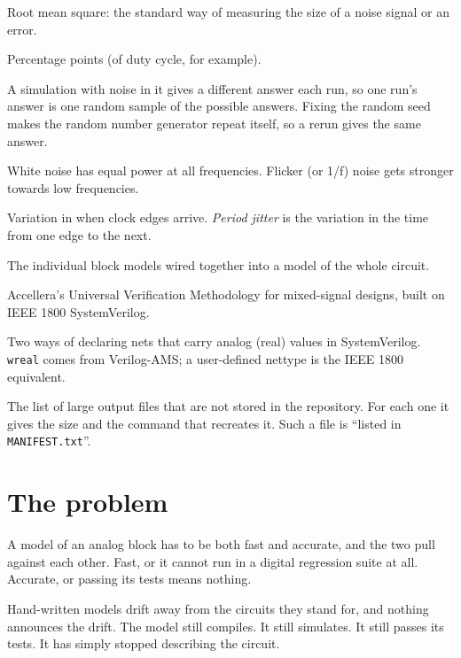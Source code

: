 \documentclass[11pt,a4paper]{article}
\begin{document}
\begin{description}[leftmargin=1.5em,itemsep=0.15em,font=\normalfont\bfseries]
  \item[rms] Root mean square: the standard way of measuring the size
        of a noise signal or an error.
  \item[pp] Percentage points (of duty cycle, for example).
  \item[Random sample, fixed random seed] A simulation with noise in
        it gives a different answer each run, so one run's answer is
        one random sample of the possible answers. Fixing the random
        seed makes the random number generator repeat itself, so a
        rerun gives the same answer.
  \item[White and flicker noise] White noise has equal power at all
        frequencies. Flicker (or 1/f) noise gets stronger towards low
        frequencies.
  \item[Jitter] Variation in when clock edges arrive. \emph{Period
        jitter} is the variation in the time from one edge to the
        next.
  \item[Composed model] The individual block models wired together
        into a model of the whole circuit.
  \item[UVM-MS] Accellera's Universal Verification Methodology for
        mixed-signal designs, built on IEEE 1800 SystemVerilog.
  \item[\texttt{wreal}, nettype] Two ways of declaring nets that carry
        analog (real) values in SystemVerilog. \texttt{wreal} comes
        from Verilog-AMS; a user-defined nettype is the IEEE 1800
        equivalent.
  \item[\texttt{MANIFEST.txt}] The list of large output files that are
        not stored in the repository. For each one it gives the size
        and the command that recreates it. Such a file is ``listed in
        \texttt{MANIFEST.txt}''.
\end{description}

\section{The problem}

A model of an analog block has to be both fast and accurate, and the
two pull against each other. Fast, or it cannot run in a digital
regression suite at all. Accurate, or passing its tests means nothing.

Hand-written models drift away from the circuits they stand for, and
nothing announces the drift. The model still compiles. It still
simulates. It still passes its tests. It has simply stopped describing
the circuit.
\end{document}
